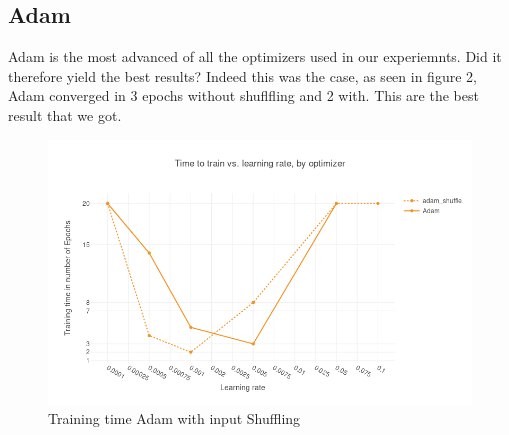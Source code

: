 \subsection{Adam}
Adam is the most advanced of all the optimizers used in our experiemnts. Did it therefore yield the best results? Indeed this was the case, as seen in figure 2, Adam converged in 3 epochs without shuflfling and 2 with. This are the best result that we got. 
\begin{figure}[h]
    \centering
			\includegraphics[scale=0.45]{images/results_adam_shuffle} 
    \caption{Training time Adam with input Shuffling}
    \label{fig:results_adam_shuffle}
\end{figure}